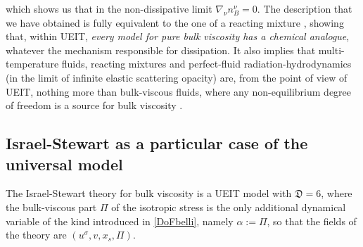 \documentclass[a4paper, amsfonts, amssymb, amsmath, reprint, twocolumn, showkeys, nofootinbib]{revtex4-2}
\begin{document}
which shows us that in the non-dissipative limit $\nabla_\nu n_B^\nu =0$. The description that we have obtained is fully equivalent to the one of a reacting mixture \cite{noto_rel}, showing that, within UEIT, \emph{every model for pure bulk viscosity has a chemical analogue}, whatever the mechanism responsible for dissipation. It also implies that multi-temperature fluids, reacting mixtures and perfect-fluid radiation-hydrodynamics (in the limit of infinite elastic scattering opacity) are, from the point of view of UEIT, nothing more than bulk-viscous fluids, where any non-equilibrium degree of freedom is  a source for bulk viscosity \citep{GavassinoRadiazione}. 


\subsection{Israel-Stewart as a particular case of the universal model}

The Israel-Stewart theory for bulk viscosity is a UEIT model with $\mathfrak{D}=6$, where the bulk-viscous part $\Pi$ of the isotropic stress is the only additional dynamical variable of the kind introduced in \eqref{DoFbelli}, namely $\alpha := \Pi$, so that the fields of the theory are $(u^\sigma,v, x_s,\Pi)$.
\end{document}
